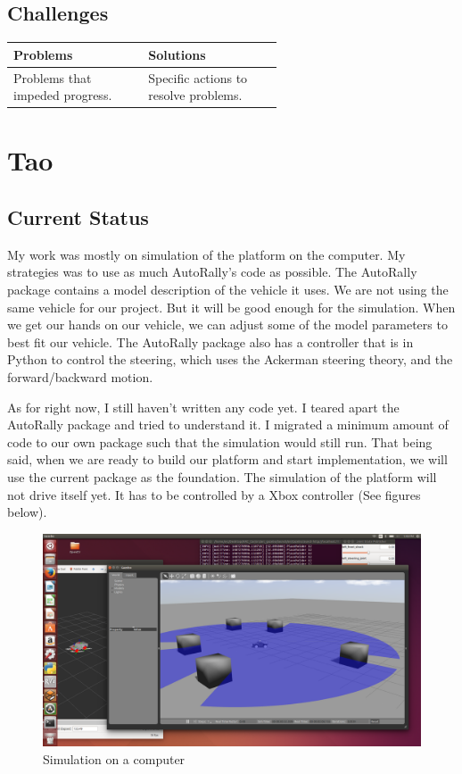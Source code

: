 \documentclass[compsoc,draftclsnofoot,onecolumn,10pt]{IEEEtran}
\begin{document}
	\subsection{Challenges}
		
		\begin{tabular}{|p{0.3\linewidth}|p{0.3\linewidth}|}
			\hline
			\textbf{Problems} & \textbf{Solutions}\\
			\hline
			Problems that impeded progress. & Specific actions to resolve problems.\\
			\hline
						
		\end{tabular}
		
\section{Tao}
\subsection{Current Status}
My work was mostly on simulation of the platform on the computer. My strategies was to use as much AutoRally's code as possible. The AutoRally package contains a model description of the vehicle it uses. We are not using the same vehicle for our project. But it will be good enough for the simulation. When we get our hands on our vehicle, we can adjust some of the model parameters to best fit our vehicle. The AutoRally package also has a controller that is in Python to control the steering, which uses the Ackerman steering theory, and the forward/backward motion. \par     

As for right now, I still haven't written any code yet. I teared apart the AutoRally package and tried to understand it. I migrated a minimum amount of code to our own package such that the simulation would still run. That being said, when we are ready to build our platform and start implementation, we will use the current package as the foundation. The simulation of the platform will not drive itself yet. It has to be controlled by a Xbox controller (See figures below). \par 

\begin{figure}[H]
  \centering
  \includegraphics[width=\textwidth]{arc_prog_report_Tao_3}
  \caption{Simulation on a computer}
\end{figure}
\end{document}
